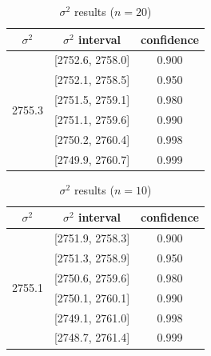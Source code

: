\documentclass[conference]{IEEEtran}
\begin{document}
\begin{table}
    \centering
    \caption{\(\sigma^2\) results (\(n = 20\))}
    \label{tab:resultssigmasplit}
    \begin{tabular}{ccc}
        \toprule
        \(\sigma^2\) & \(\sigma^2\) interval & confidence \\
        \midrule
        \multirow{6}{*}{\num{2755.3}}
         & {[}\num{2752.6}, \num{2758.0}{]} & \num{0.900} \\
         & {[}\num{2752.1}, \num{2758.5}{]} & \num{0.950} \\
         & {[}\num{2751.5}, \num{2759.1}{]} & \num{0.980} \\
         & {[}\num{2751.1}, \num{2759.6}{]} & \num{0.990} \\
         & {[}\num{2750.2}, \num{2760.4}{]} & \num{0.998} \\
         & {[}\num{2749.9}, \num{2760.7}{]} & \num{0.999} \\
        \bottomrule
    \end{tabular}
\end{table}

\begin{table}
    \centering
    \caption{\(\sigma^2\) results (\(n = 10\))}
    \label{tab:resultssigmanotsplit}
    \begin{tabular}{ccc}
        \toprule
        \(\sigma^2\) & \(\sigma^2\) interval & confidence \\
        \midrule
        \multirow{6}{*}{\num{2755.1}}
         & {[}\num{2751.9}, \num{2758.3}{]} & \num{0.900} \\
         & {[}\num{2751.3}, \num{2758.9}{]} & \num{0.950} \\
         & {[}\num{2750.6}, \num{2759.6}{]} & \num{0.980} \\
         & {[}\num{2750.1}, \num{2760.1}{]} & \num{0.990} \\
         & {[}\num{2749.1}, \num{2761.0}{]} & \num{0.998} \\
         & {[}\num{2748.7}, \num{2761.4}{]} & \num{0.999} \\
        \bottomrule
    \end{tabular}
\end{table}
\end{document}
